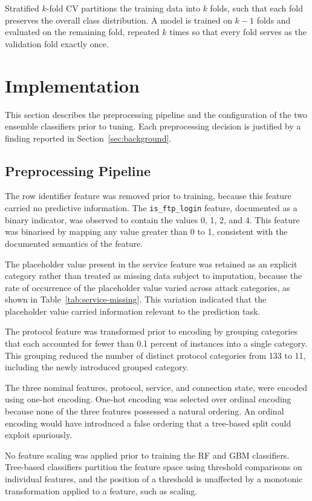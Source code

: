 \documentclass[conference,10pt]{IEEEtran}
\begin{document}
Stratified $k$-fold CV partitions the training data into $k$ folds, such that each fold preserves the overall class distribution. A model is trained on $k-1$ folds and evaluated on the remaining fold, repeated $k$ times so that every fold serves as the validation fold exactly once.

\section{Implementation}
\label{sec:implementation}
This section describes the preprocessing pipeline and the configuration of the two ensemble classifiers prior to tuning. Each preprocessing decision is justified by a finding reported in Section~\ref{sec:background}.

\subsection{Preprocessing Pipeline}
The row identifier feature was removed prior to training, because this feature carried no predictive information. The \texttt{is\_ftp\_login} feature, documented as a binary indicator, was observed to contain the values 0, 1, 2, and 4. This feature was binarised by mapping any value greater than 0 to 1, consistent with the documented semantics of the feature.

The placeholder value present in the service feature was retained as an explicit category rather than treated as missing data subject to imputation, because the rate of occurrence of the placeholder value varied across attack categories, as shown in Table~\ref{tab:service-missing}. This variation indicated that the placeholder value carried information relevant to the prediction task.

The protocol feature was transformed prior to encoding by grouping categories that each accounted for fewer than 0.1 percent of instances into a single category. This grouping reduced the number of distinct protocol categories from 133 to 11, including the newly introduced grouped category.

The three nominal features, protocol, service, and connection state, were encoded using one-hot encoding. One-hot encoding was selected over ordinal encoding because none of the three features possessed a natural ordering. An ordinal encoding would have introduced a false ordering that a tree-based split could exploit spuriously.

No feature scaling was applied prior to training the RF and GBM classifiers. Tree-based classifiers partition the feature space using threshold comparisons on individual features, and the position of a threshold is unaffected by a monotonic transformation applied to a feature, such as scaling.
\end{document}
